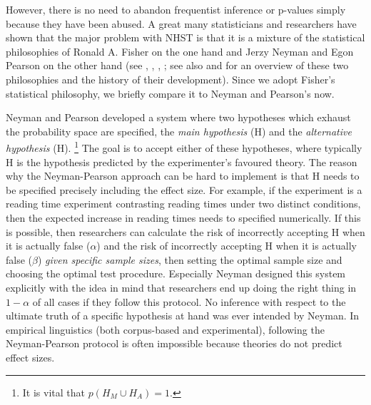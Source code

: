 However, there is no need to abandon frequentist inference or p-values simply because they have been abused.
A great many statisticians and researchers have shown that the major problem with NHST is that it is a mixture of the statistical philosophies of Ronald A. Fisher on the one hand and Jerzy Neyman and Egon Pearson on the other hand (see \citealt{Goodman2008}, \citealt{Perezgonzalez2014}, \citealt{Perezgonzalez2015}, \citealt{GreenlandEa2016}; see also \citealt{Lehmann1993} and \citealt{Lehmann2011} for an overview of these two philosophies and the history of their development).
Since we adopt Fisher's statistical philosophy, we briefly compare it to Neyman and Pearson's now.

Neyman and Pearson developed a system where two hypotheses which exhaust the probability space are specified, the \textit{main hypothesis} (H) and the \textit{alternative hypothesis} (H).%
\footnote{It is vital that $p(H_M\cup H_A)=1$.}
The goal is to accept either of these hypotheses, where typically H is the hypothesis predicted by the experimenter's favoured theory.
The reason why the Neyman-Pearson approach can be hard to implement is that H needs to be specified precisely including the effect size.
For example, if the experiment is a reading time experiment contrasting reading times under two distinct conditions, then the expected increase in reading times needs to specified numerically.
If this is possible, then researchers can calculate the risk of incorrectly accepting H when it is actually false ($\alpha$) and the risk of incorrectly accepting H when it is actually false ($\beta$) \textit{given specific sample sizes}, then setting the optimal sample size and choosing the optimal test procedure.
Especially Neyman designed this system explicitly with the idea in mind that researchers end up doing the right thing in $1-\alpha$ of all cases if they follow this protocol.
No inference with respect to the ultimate truth of a specific hypothesis at hand was ever intended by Neyman.
In empirical linguistics (both corpus-based and experimental), following the Neyman-Pearson protocol is often impossible because theories do not predict effect sizes.

